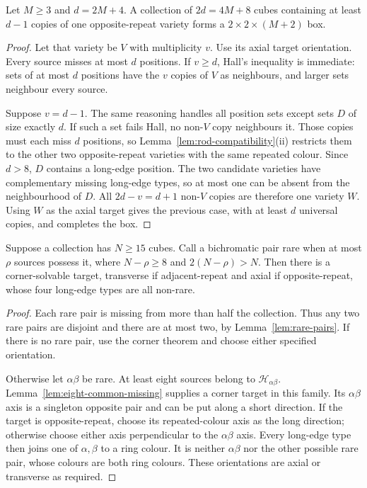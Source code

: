 \begin{lemma}\label{lem:rod-concentration}
Let $M\ge3$ and $d=2M+4$. A collection of $2d=4M+8$ cubes containing
at least $d-1$ copies of one opposite-repeat variety forms a
$2\times2\times(M+2)$ box.
\end{lemma}

\begin{proof}
Let that variety be $V$ with multiplicity $v$. Use its axial target
orientation. Every source misses at most $d$ positions. If $v\ge d$,
Hall's inequality is immediate: sets of at most $d$ positions have the
$v$ copies of $V$ as neighbours, and larger sets neighbour every source.

Suppose $v=d-1$. The same reasoning handles all position sets except
sets $D$ of size exactly $d$. If such a set fails Hall, no non-$V$
copy neighbours it. Those copies must each miss $d$ positions, so
Lemma~\ref{lem:rod-compatibility}(ii) restricts them to the other two
opposite-repeat varieties with the same repeated colour. Since $d>8$,
$D$ contains a long-edge position. The two candidate varieties have
complementary missing long-edge types, so at most one can be absent
from the neighbourhood of $D$. All $2d-v=d+1$ non-$V$ copies are
therefore one variety $W$. Using $W$ as the axial target gives the
previous case, with at least $d$ universal copies, and completes the box.
\end{proof}

\begin{lemma}\label{lem:rod-target}
Suppose a collection has $N\ge15$ cubes. Call a bichromatic pair rare
when at most $\rho$ sources possess it, where $N-\rho\ge8$ and
$2(N-\rho)>N$. Then there is a corner-solvable target, transverse if
adjacent-repeat and axial if opposite-repeat, whose four long-edge
types are all non-rare.
\end{lemma}

\begin{proof}
Each rare pair is missing from more than half the collection. Thus any
two rare pairs are disjoint and there are at most two, by
Lemma~\ref{lem:rare-pairs}. If there is no
rare pair, use the corner theorem and choose either specified orientation.

Otherwise let $\alpha\beta$ be rare. At least eight sources belong to
$\mathcal H_{\alpha\beta}$. Lemma~\ref{lem:eight-common-missing} supplies a corner target
in this family. Its $\alpha\beta$ axis is a singleton opposite pair and can be
put along a short direction. If the target is opposite-repeat, choose
its repeated-colour axis as the long direction; otherwise choose either
axis perpendicular to the $\alpha\beta$ axis. Every long-edge type then joins
one of $\alpha,\beta$ to a ring colour. It is neither $\alpha\beta$ nor the other possible
rare pair, whose colours are both ring colours. These orientations are
axial or transverse as required.
\end{proof}


